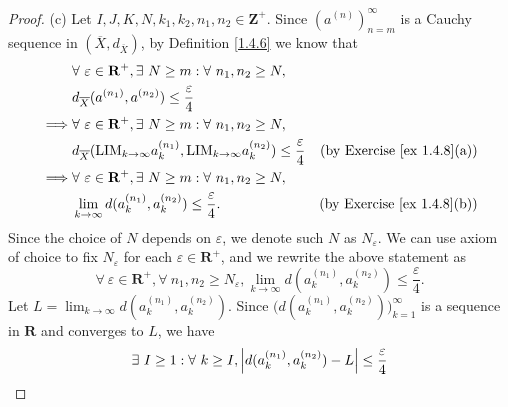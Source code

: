 \begin{proof}{(c)}
    Let \(I, J, K, N, k_1, k_2, n_1, n_2 \in \mathbf{Z}^+\).
    Since \((a^{(n)})_{n = m}^\infty\) is a Cauchy sequence in \((\overline{X}, d_{\overline{X}})\), by Definition \ref{1.4.6} we know that
    \begin{align*}
                 & \forall\ \varepsilon \in \mathbf{R}^+, \exists\ N \geq m : \forall\ n_1, n_2 \geq N,                                                                               \\
                 & d_{\overline{X}}(a^{(n_1)}, a^{(n_2)}) \leq \frac{\varepsilon}{4}                                                                                                  \\
        \implies & \forall\ \varepsilon \in \mathbf{R}^+, \exists\ N \geq m : \forall\ n_1, n_2 \geq N,                                                                               \\
                 & d_{\overline{X}}(\text{LIM}_{k \to \infty} a_k^{(n_1)}, \text{LIM}_{k \to \infty} a_k^{(n_2)}) \leq \frac{\varepsilon}{4} & \text{(by Exercise \ref{ex 1.4.8}(a))} \\
        \implies & \forall\ \varepsilon \in \mathbf{R}^+, \exists\ N \geq m : \forall\ n_1, n_2 \geq N,                                                                               \\
                 & \lim_{k \to \infty} d(a_k^{(n_1)}, a_k^{(n_2)}) \leq \frac{\varepsilon}{4}.                                               & \text{(by Exercise \ref{ex 1.4.8}(b))}
    \end{align*}
    Since the choice of \(N\) depends on \(\varepsilon\), we denote such \(N\) as \(N_\varepsilon\).
    We can use axiom of choice to fix \(N_\varepsilon\) for each \(\varepsilon \in \mathbf{R}^+\), and we rewrite the above statement as
    \[
        \forall\ \varepsilon \in \mathbf{R}^+, \forall\ n_1, n_2 \geq N_\varepsilon, \lim_{k \to \infty} d(a_k^{(n_1)}, a_k^{(n_2)}) \leq \frac{\varepsilon}{4}.
    \]
    Let \(L = \lim_{k \to \infty} d(a_k^{(n_1)}, a_k^{(n_2)})\).
    Since \(\Big(d(a_k^{(n_1)}, a_k^{(n_2)})\Big)_{k = 1}^\infty\) is a sequence in \(\mathbf{R}\) and converges to \(L\), we have
    \begin{align*}
                 & \exists\ I \geq 1 : \forall\ k \geq I, \abs*{d(a_k^{(n_1)}, a_k^{(n_2)}) - L} \leq \frac{\varepsilon}{4}                                                                                           \\

\end{align*}
\end{proof}
